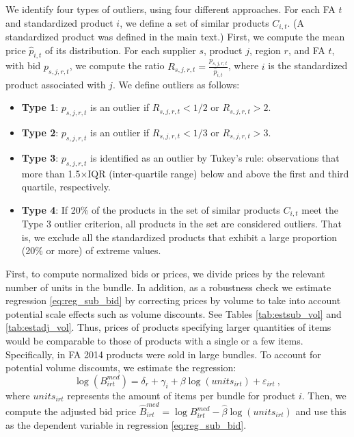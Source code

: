We identify four types of outliers, using four different approaches. For each FA $t$ and standardized product $i$, we define a set of similar products $C_{i,t}$. (A standardized product was defined in the main text.) First, we compute the mean price $\hat{p}_{i,t}$ of its distribution. For each supplier $s$, product $j$, region $r$, and FA $t$, with bid $p_{s,j,r,t}$, we compute the ratio $R_{s,j,r,t} = \frac{p_{s,j,r,t}}{\hat{p}_{i,t}}$, where $i$ is the standardized product associated with $j$. We define outliers as follows:

\begin{itemize}
\item[] \textbf{Type 1}: $p_{s,j,r,t}$ is an outlier if $R_{s,j,r,t}<1/2$ or $R_{s,j,r,t}>2$.
\item[] \textbf{Type 2}: $p_{s,j,r,t}$ is an outlier if $R_{s,j,r,t}<1/3$ or $R_{s,j,r,t}>3$.
\item[] \textbf{Type 3}: $p_{s,j,r,t}$ is identified as an outlier by Tukey's rule: observations that more than 1.5$\times$IQR (inter-quartile range) below and above the first and third quartile, respectively.
\item[] \textbf{Type 4}: If 20\% of the products in the set of similar products $C_{i,t}$ meet the Type 3 outlier criterion, all products in the set are considered outliers. That is, we exclude all the standardized products that exhibit a large proportion (20\% or more) of extreme values.%
\end{itemize}

First, to compute normalized bids or prices, we divide prices by the relevant number of units in the bundle.
In addition, as a robustness check we estimate regression \eqref{eq:reg_sub_bid} by correcting prices by volume to take into account potential scale effects such as volume discounts. See Tables \ref{tab:estsub_vol} and \ref{tab:estadj_vol}. Thus, prices of products specifying larger quantities of items would be comparable to those of products with a single or a few items. Specifically, in FA 2014 products were sold in large bundles. To account for potential volume discounts, we estimate 
 the regression: 
\begin{equation}
    \log (B^{med}_{irt}) = \delta_r + \gamma_i + \beta \log(units_{irt}) + \varepsilon_{irt} \ ,
    \label{eq:reg_sub_bid_rob}
\end{equation}
where $units_{irt}$ represents the amount of items per bundle for product $i$. Then, we compute the adjusted bid price  $\hat{B}^{med}_{irt} = \log B^{med}_{irt} - \hat{\beta}\log(units_{irt})$ and use this as the dependent variable in regression \eqref{eq:reg_sub_bid}.

